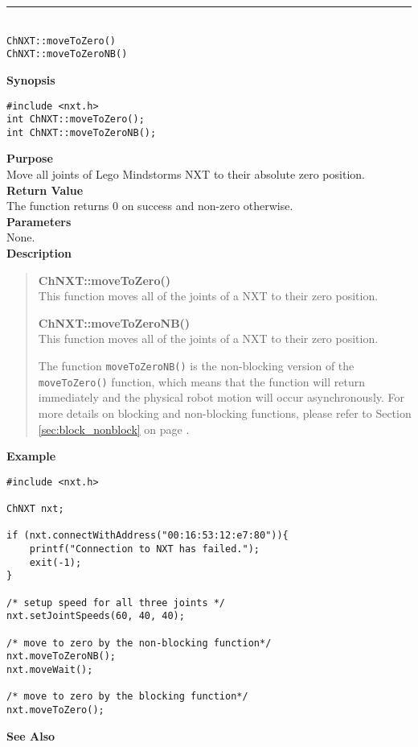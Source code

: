 \noindent
\vspace{5pt}
\rule{4.5in}{0.015in}\\
\noindent
{\LARGE \texttt{ChNXT::moveToZero()} }\\
{\LARGE \texttt{ChNXT::moveToZeroNB()} }\\


\noindent
{\bf Synopsis}
\vspace{-8pt}
\begin{verbatim}
#include <nxt.h>
int ChNXT::moveToZero();
int ChNXT::moveToZeroNB();
\end{verbatim}

\noindent
{\bf Purpose}\\
Move all joints of Lego Mindstorms NXT to their absolute zero position. \\

\noindent
{\bf Return Value}\\
The function returns 0 on success and non-zero otherwise.\\

\noindent
{\bf Parameters}\\
None.\\

\noindent
{\bf Description}\\
\vspace{-12pt}
\begin{quote}
{\bf ChNXT::moveToZero()}\\
This function moves all of the joints of a NXT to their zero 
position.

{\bf ChNXT::moveToZeroNB()}\\
This function moves all of the joints of a NXT to their zero 
position.

The function \texttt{moveToZeroNB()} is the non-blocking version 
of the \texttt{moveToZero()} function, which means that the 
function will return immediately and the physical robot motion 
will occur asynchronously. For more details on blocking and 
non-blocking functions, please refer to Section \ref{sec:block_nonblock}
on page \pageref{sec:block_nonblock}.\\
\end{quote}

\noindent
{\bf Example}
\begin{verbatim}
#include <nxt.h> 

ChNXT nxt;

if (nxt.connectWithAddress("00:16:53:12:e7:80")){
    printf("Connection to NXT has failed.");
    exit(-1);
}
 
/* setup speed for all three joints */
nxt.setJointSpeeds(60, 40, 40);

/* move to zero by the non-blocking function*/
nxt.moveToZeroNB();
nxt.moveWait();

/* move to zero by the blocking function*/
nxt.moveToZero();
\end{verbatim}

\noindent
{\bf See Also}\\
